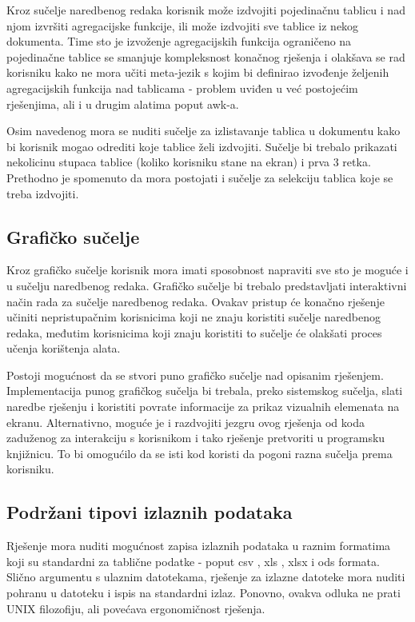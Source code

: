 \documentclass[times, utf8, zavrsni]{fer}
\begin{document}
Kroz sučelje naredbenog redaka korisnik može izdvojiti pojedinačnu tablicu i nad
njom izvršiti agregacijske funkcije, ili može izdvojiti sve tablice iz nekog
dokumenta. Time sto je izvoženje agregacijskih funkcija ograničeno na
pojedinačne tablice se smanjuje kompleksnost konačnog rješenja i olakšava se
rad korisniku kako ne mora učiti meta-jezik s kojim bi definirao izvođenje
željenih agregacijskih funkcija nad tablicama - problem uviđen u već postojećim
rješenjima, ali i u drugim alatima poput awk-a.

Osim navedenog mora se nuditi sučelje za izlistavanje tablica u dokumentu
kako bi korisnik mogao odrediti koje tablice želi izdvojiti. Sučelje bi
trebalo prikazati nekolicinu stupaca tablice (koliko korisniku stane na ekran)
i prva 3 retka.  Prethodno je spomenuto da mora postojati i sučelje za
selekciju tablica koje se treba izdvojiti.

\subsection{Grafičko sučelje}

Kroz grafičko sučelje korisnik mora imati sposobnost napraviti sve sto je
moguće i u sučelju naredbenog redaka. Grafičko sučelje bi trebalo predstavljati
interaktivni način rada za sučelje naredbenog redaka. Ovakav pristup će konačno
rješenje učiniti nepristupačnim korisnicima koji ne znaju koristiti sučelje
naredbenog redaka, međutim korisnicima koji znaju koristiti to sučelje će
olakšati proces učenja korištenja alata.

Postoji mogućnost da se stvori puno grafičko sučelje nad opisanim rješenjem.
Implementacija punog grafičkog sučelja bi trebala, preko sistemskog sučelja,
slati naredbe rješenju i koristiti povrate informacije za prikaz vizualnih
elemenata na ekranu. Alternativno, moguće je i razdvojiti jezgru ovog rješenja
od koda zaduženog za interakciju s korisnikom i tako rješenje pretvoriti u
programsku knjižnicu. To bi omogućilo da se isti kod koristi da pogoni razna
sučelja prema korisniku.

\subsection{Podržani tipovi izlaznih podataka}

Rješenje mora nuditi mogućnost zapisa izlaznih podataka u raznim formatima
koji su standardni za tablične podatke - poput csv \cite{csv_documentation},
xls \cite{xls_documentation}, xlsx \cite{xlsx_documentation} i
ods \cite{ods_documentation} formata.
Slično argumentu s ulaznim datotekama, rješenje za izlazne datoteke mora nuditi
pohranu u datoteku i ispis na standardni izlaz. Ponovno, ovakva odluka ne
prati UNIX filozofiju, ali povećava ergonomičnost rješenja.
\end{document}
